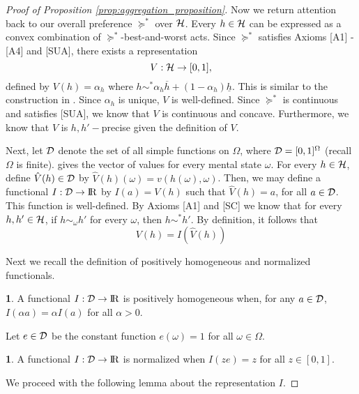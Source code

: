 \documentclass[11pt,oneside]{article}
\theoremstyle{plain}
\theoremstyle{plain}
\theoremstyle{plain}
\theoremstyle{plain}
\theoremstyle{plain}
\theoremstyle{definition}
\newtheorem{defn}[thm]{\protect\definitionname}
\theoremstyle{definition}
\theoremstyle{remark}
\theoremstyle{plain}
\providecommand{\definitionname}{Definition}
\newcommand{\R}{{\rm I\!R}}
\newcommand{\ulh}{\underline{h}}
\newcommand{\olh}{\overline{h}}
\newcommand{\pfs}{\succeq^*}
\newcommand{\convexmix}[3]{#3 #1 + (1-#3) #2}
\begin{document}
\begin{proof}[Proof of Proposition \ref{prop:aggregation_proposition}]
Now we return attention back to our overall preference $\pfs$ over ${\cal H}$.
Every $h \in {\cal H}$ can be expressed as a convex combination of $\pfs$-best-and-worst acts.
Since $\pfs$ satisfies Axioms [A1] - [A4] and [SUA], there exists a representation
\begin{equation}
    \label{eq:definition_V}
    V:{\cal H} \to [0,1],
\end{equation}
defined by $V(h)=\alpha_h$ where $h \sim^* \convexmix{\olh}{\ulh}{\alpha_h}$. This is similar to the construction in \cite{hill2019non}. 
Since $\alpha_h$ is unique, $V$ is well-defined. Since $\pfs$ is continuous and satisfies [SUA], we know that
$V$ is continuous and concave. Furthermore, we know that $V$ is $h,h'-$precise given the definition of $V$.

Next, let ${\cal D}$ denote the set of all simple functions on
$\Omega$, where ${\cal D}=[0,1]^\Omega$ (recall $\Omega$ is finite).
gives the vector of values for every mental state $\omega$. For every $h\in {\cal H}$, define
$\hat{V}(h)\in {\cal D}$ by $\hat{V}(h)(\omega) = v(h(\omega),\omega)$.
Then, we may define a functional $I:{\cal D}\to \R$ by $I(a) = V(h)$ such that $\hat{V}(h) =a$, for all $a\in {\cal D}$. This function is well-defined.
By Axioms [A1] and [SC] we know that 
for every $h,h' \in {\cal H}$, if $h\sim_\omega h'$ for every $\omega$, then $h\sim^* h'$. By definition, it follows that
\begin{equation}
    \label{eq:definition_I}
    V(h) = I(\hat{V}(h))
\end{equation}

Next we recall the definition of positively homogeneous and normalized functionals.
\begin{defn}
\label{defn:positve_homogeneous}
A functional $I:{\cal D} \to \R$ is positively homogeneous when, for any $a\in {\cal D}$, $I(\alpha a) = \alpha I(a)$ for all $\alpha>0$.
\end{defn}
Let $e \in {\cal D}$ be the constant function $e(\omega)=1$ for all $\omega \in \Omega$.
\begin{defn}
\label{defn:normalized}
A functional $I:{\cal D}\to \R$ is normalized when $I(z e) = z$ for all $z\in [0,1]$.
\end{defn}

We proceed with the following lemma about the representation $I$.


\end{proof}
\end{document}
